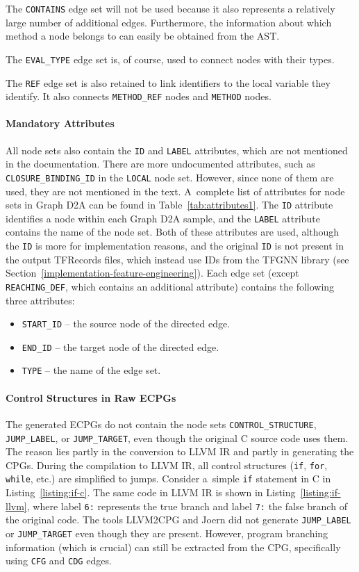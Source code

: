 The \texttt{CONTAINS} edge set will not be used because it also represents a relatively large number of additional edges. Furthermore, the information about which method a node belongs to can easily be obtained from the AST.

The \texttt{EVAL\_TYPE} edge set is, of course, used to connect nodes with their types.

The \texttt{REF} edge set is also retained to link identifiers to the local variable they identify. It also connects \texttt{METHOD\_REF} nodes and \texttt{METHOD} nodes.

\paragraph{Mandatory Attributes}
All node sets also contain the \texttt{ID} and \texttt{LABEL} attributes, which are not mentioned in the documentation. There are more undocumented attributes, such as \texttt{CLOSURE\_BINDING\_ID} in the \texttt{LOCAL} node set. However, since none of them are used, they are not mentioned in the text. A~complete list of attributes for node sets in Graph D2A can be found in Table~\ref{tab:attributes1}. The \texttt{ID} attribute identifies a node within each Graph D2A sample, and the \texttt{LABEL} attribute contains the name of the node set. Both of these attributes are used, although the \texttt{ID} is more for implementation reasons, and the original \texttt{ID} is not present in the output TFRecords files, which instead use IDs from the TFGNN library (see Section~\ref{implementation-feature-engineering}). Each edge set (except \texttt{REACHING\_DEF}, which contains an additional attribute) contains the following three attributes:
\begin{itemize}
    \item \texttt{START\_ID} -- the source node of the directed edge.
    \item \texttt{END\_ID} -- the target node of the directed edge.
    \item \texttt{TYPE} -- the name of the edge set.
\end{itemize}


\paragraph{Control Structures in Raw ECPGs}
The generated ECPGs do not contain the node sets \texttt{CONTROL\_STRUCTURE}, \texttt{JUMP\_LABEL}, or \texttt{JUMP\_TARGET}, even though the original C source code uses them. The reason lies partly in the conversion to LLVM IR and partly in generating the CPGs. During the compilation to LLVM IR, all control structures (\texttt{if}, \texttt{for}, \texttt{while}, etc.) are simplified to jumps. Consider a~simple \texttt{if} statement in C in Listing~\ref{listing:if-c}. The same code in LLVM IR is shown in Listing~\ref{listing:if-llvm}, where label \texttt{6:} represents the true branch and label \texttt{7:} the false branch of the original code. The tools LLVM2CPG and Joern did not generate \texttt{JUMP\_LABEL} or \texttt{JUMP\_TARGET} even though they are present. However, program branching information (which is crucial) can still be extracted from the CPG, specifically using \texttt{CFG} and \texttt{CDG} edges.

